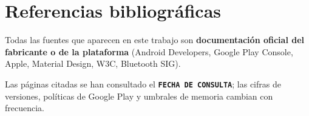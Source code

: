 \documentclass[11pt,a4paper]{article}
\begin{document}
	\section*{Referencias bibliográficas}
	
	Todas las fuentes que aparecen en este trabajo son \textbf{documentación oficial del fabricante o de la plataforma} (Android Developers, Google Play Console, Apple, Material Design, W3C, Bluetooth SIG).
	
	Las páginas citadas se han consultado el \textbf{\texttt{FECHA DE CONSULTA}}; las cifras de versiones, políticas de Google Play y umbrales de memoria cambian con frecuencia.
	
\end{document}
